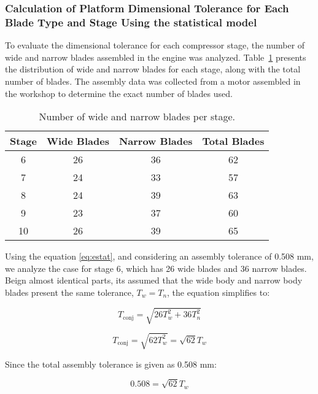 \subsubsection{Calculation of Platform Dimensional Tolerance for Each Blade Type and Stage Using the statistical model}
\label{subsubsec:clearance_calculation1}
To evaluate the dimensional tolerance for each compressor stage, the number of wide and narrow blades assembled in the engine was analyzed. Table~\ref{tab:blade_distribution} presents the distribution of wide and narrow blades for each stage, along with the total number of blades.
The assembly data was collected from a motor assembled in the workshop to determine the exact number of blades used.
\begin{table}[h]
    \centering
    \begin{tabular}{@{}cccc@{}}
        \toprule
        Stage & Wide Blades & Narrow Blades & Total Blades \\ 
        \midrule
        6  & 26 & 36 & 62 \\ 
        7  & 24 & 33 & 57 \\ 
        8  & 24 & 39 & 63 \\ 
        9  & 23 & 37 & 60 \\ 
        10 & 26 & 39 & 65 \\ 
        \bottomrule
    \end{tabular}
    \caption{Number of wide and narrow blades per stage.}
    \label{tab:blade_distribution}
\end{table}

Using the equation \ref{eq:estat}, and considering an assembly tolerance of 0.508 mm, we analyze the case for stage 6, which has 26 wide blades and 36 narrow blades. Beign almost identical parts, its assumed that the wide body and narrow body blades present the same tolerance, \( T_w = T_n \), the equation simplifies to:

\begin{equation}
    T_{\text{conj}} = \sqrt{26T_w^2 + 36T_n^2}
\end{equation}

\begin{equation}
    T_{\text{conj}} = \sqrt{62T_w^2} = \sqrt{62} T_w
\end{equation}

Since the total assembly tolerance is given as 0.508 mm:

\begin{equation}
    0.508 = \sqrt{62} T_w
\end{equation}

